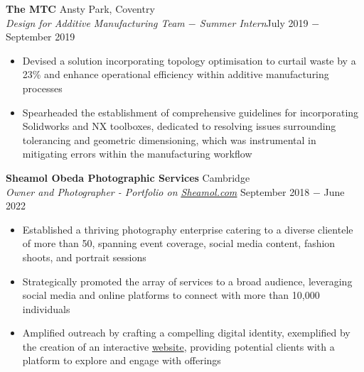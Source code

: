 \documentclass{article}
\begin{document}
\textbf{The MTC} \hfill Ansty Park, Coventry \\
\textit{Design for Additive Manufacturing Team $-$ Summer Intern}\hfill July 2019 $-$ September 2019
\begin{itemize}
    \item Devised a solution incorporating topology optimisation to curtail waste by a 23\% and enhance operational efficiency within additive manufacturing processes
    \item Spearheaded the establishment of comprehensive guidelines for incorporating Solidworks and NX toolboxes, dedicated to resolving issues surrounding tolerancing and geometric dimensioning, which was instrumental in mitigating errors within the manufacturing workflow
\end{itemize} \medskip

\textbf{Sheamol Obeda Photographic Services} \hfill Cambridge\\
\textit{Owner and Photographer - Portfolio on \href{www.sheamol.com}{\underline{Sheamol.com}}} \hfill September 2018 $-$ June 2022
\begin{itemize}
    \item Established a thriving photography enterprise catering to a diverse clientele of more than 50, spanning event coverage, social media content, fashion shoots, and portrait sessions
    \item Strategically promoted the array of services to a broad audience, leveraging social media and online platforms to connect with more than 10,000 individuals
    \item Amplified outreach by crafting a compelling digital identity, exemplified by the creation of an interactive \href{www.sheamol.com}{website}, providing potential clients with a platform to explore and engage with offerings
\end{itemize} \medskip

\end{document}
